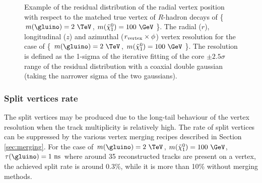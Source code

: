 \documentclass[NOTE, atlasdraft=true, texlive=2018, UKenglish]{\ATLASLATEXPATH atlasdoc}
\begin{document}
\begin{figure}[tbp]
\begin{center}
\caption{ Example of the residual distribution of the radial vertex position with respect to the matched true vertex of $R$-hadron decays of \{ $m(\gluino) = 2~\TeV$, $m(\tilde{\chi}_{1}^{0}) = 100~\GeV$ \}.  The radial ($r$), longitudinal ($z$) and azimuthal ($r_{\rm vertex}\times\phi$) vertex resolution for the case of \{ $m(\gluino) = 2~\TeV$, $m(\tilde{\chi}_{1}^{0}) = 100~\GeV$ \}. The resolution is defined as the 1-sigma of the iterative fitting of the core $\pm2.5\sigma$ range of the residual distribution with a coaxial double gaussian (taking the narrower sigma of the two gaussians).}
\label{fig:Rhadron_trackType}
\end{center}
\end{figure}

\subsubsection{Split vertices rate}
The split vertices may be produced due to the long-tail behaviour of the vertex resolution when the track multiplicity is relatively high. The rate of split vertices can be suppressed by the various vertex merging recipes described in Section \ref{sec:merging}. For the case of $m(\gluino) = 2~\TeV$, $m(\tilde{\chi}_{1}^{0}) = 100~\GeV$, $\tau(\gluino) = 1~{\rm ns}$ where around 35 reconstructed tracks are present on a vertex, the achieved split rate is around 0.3\%, while it is more than 10\% without merging methods.
\end{document}
